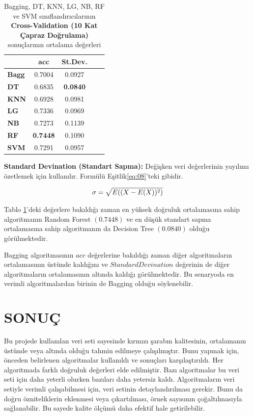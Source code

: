 \documentclass[conference]{IEEEtran}
\begin{document}
\begin{table}[h]
	\centering
	\normalsize
	\begin{tabular}{|l|c|c|c|c|}
		\hline
					& \textbf{acc}		& \textbf{St.Dev.}		\\ \hline
		\textbf{Bagg}	& 0.7004			& 0.0927			\\ \hline
		\textbf{DT}		& 0.6835			& \textbf{0.0840}		\\ \hline
		\textbf{KNN}	& 0.6928			& 0.0981 			\\ \hline
		\textbf{LG}		& 0.7336			& 0.0969			\\ \hline
		\textbf{NB}		& 0.7273			& 0.1139			\\ \hline
		\textbf{RF}		& \textbf{0.7448}		& 0.1090			\\ \hline
		\textbf{SVM}	& 0.7291			& 0.0957			\\ \hline
	\end{tabular}
	\caption{Bagging, DT, KNN, LG, NB, RF ve SVM sınıflandırıcılarının \textbf{Cross-Validation (10 Kat Çapraz Doğrulama)} sonuçlarının ortalama değerleri}
	\label{tbl:02}
\end{table}

\textbf{Standard Devination (Standart Sapma): } Değişken veri değerlerinin yayılımı özetlemek için kullanılır. Formülü Eşitlik\ref{eq:08}’teki gibidir.

\begin{equation}
\label{eq:08}
\Large \sigma= \sqrt{E((X-E(X))_{}^{2})}
\end{equation}

\quad Tablo \ref{tbl:02}'deki değerlere bakıldığı zaman en yüksek doğruluk ortalamasına sahip algoritmanın Random Forest $(0.7448)$ ve en düşük standart sapma ortalamasına sahip algoritmanın da Decision Tree $(0.0840)$ olduğu görülmektedir.

\quad Bagging algoritmasının $acc$ değerlerine bakıldığı zaman diğer algoritmaların ortalamasının üstünde kaldığını ve $StandardDevination$ değerinin de diğer algoritmaların ortalamasının altında kaldığı görülmektedir. Bu senaryoda en verimli algoritmalardan birinin de Bagging olduğu söylenebilir.



\pagebreak

\section{\textbf{SONUÇ}}
\quad Bu projede kullanılan veri seti sayesinde kırmızı şarabın kalitesinin, ortalamanın üstünde veya altında olduğu tahmin edilmeye çalışılmıştır. Bunu yapmak için, önceden belirlenen algoritmalar kullanıldı ve sonuçları karşılaştırıldı. Her algoritmada farklı doğruluk değerleri elde edilmiştir. Bazı algoritmalar bu veri seti için daha yeterli olurken bazıları daha yetersiz kaldı. Algoritmaların veri setiyle verimli çalışabilmesi için, veri setinin detaylandırılması gerekir. Bunu da doğru özniteliklerin eklenmesi veya çıkartılması, örnek sayısının çoğaltılmasıyla sağlanabilir. Bu sayede kalite ölçümü daha efektif hale getirilebilir.
\end{document}
